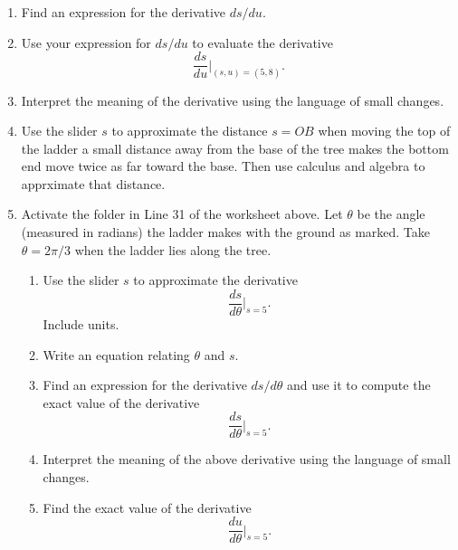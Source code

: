 \documentclass{ximera}
\begin{document}
\begin{question}
\begin{enumerate}
\item Find an expression for the derivative $ds/du$.

\item Use your expression for $ds/du$ to evaluate the derivative
\[
\frac{ds}{du}\Big|_{(s,u) = (5,8)} .
\]

\item Interpret the meaning of the derivative using the language of small changes.

\item Use the slider $s$ to approximate the distance $s=OB$ when moving the top of the ladder a small distance away from the base of the tree makes the bottom end move twice as far toward the base. Then use calculus and algebra to apprximate that distance.

\item Activate the folder in Line 31 of the worksheet above.  Let $\theta$ be the angle (measured in radians) the ladder makes with the ground as marked. Take $\theta=2\pi/3$ when the ladder lies along the tree.

\begin{enumerate}
\item Use the slider $s$ to approximate the derivative 
\[
\frac{ds}{d\theta}\Big|_{s=5} .
\]
Include units.

\item Write an equation relating $\theta$ and $s$.

\item Find an expression for the derivative $ds/d\theta$ and use it to compute the exact value of the derivative
\[
\frac{ds}{d\theta}\Big|_{s=5} .
\]

\item Interpret the meaning of the above derivative using the language of small changes.

\item Find the exact value of the derivative
\[
\frac{du}{d\theta}\Big|_{s=5} .
\]

\end{enumerate}



\end{enumerate}

\end{question}
\end{document}
